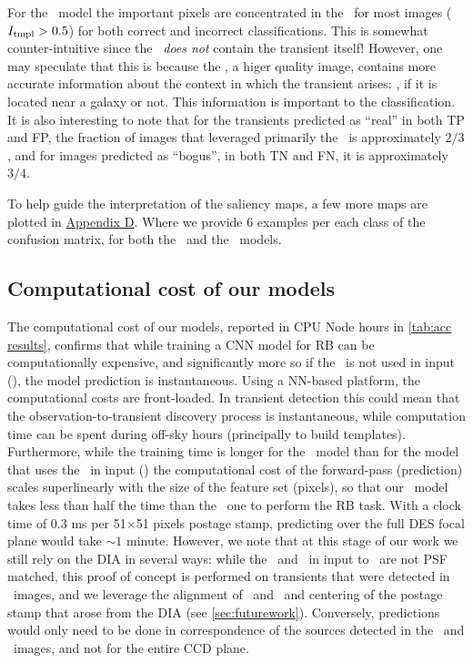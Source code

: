 For the \nodia\ model the important pixels are concentrated in the \temp\  for most images ($I_\mathrm{tmpl} > 0.5$) for both correct and incorrect classifications.
This is somewhat counter-intuitive since the \temp\ {\it does not} contain the transient itself! However, one may speculate that this is because the \temp, a higer quality image, contains more accurate information about the context in which the transient arises: \eg, if it is located near a galaxy or not. This information is important to the classification. It is also interesting to note that for the transients predicted as ``real'' in both TP and FP, the fraction of images that leveraged primarily the \temp\ is approximately $2/3$, and for images predicted as ``bogus'', in both TN and FN, it is approximately $3/4$.

To help guide the interpretation of the saliency maps, a few more maps are plotted in \hyperref[sec:appendixc]{Appendix D}. Where we provide 6 examples per each class of the confusion matrix, for both the \diabased\ and the \nodia\ models. 

\subsection{Computational cost of our models}\label{sec:computationcost}
The computational cost of our models, reported in CPU Node hours in \autoref{tab:acc results}, confirms that while training a CNN model for RB can be computationally expensive, and significantly more so if the \diff\ is not used in input (\nodia), the model prediction is instantaneous. Using a NN-based platform, the computational costs are front-loaded. In transient detection this could mean that the observation-to-transient discovery process is instantaneous, while computation time can be spent during off-sky hours (principally to build templates). Furthermore, while the training time is longer for the \nodia\ model than for the model that uses the \diff\ in input (\diabased) the computational cost of the forward-pass (prediction) scales superlinearly with the size of the feature set (pixels), so that our \nodia\ model takes less than half the time than the \diabased\ one to perform the RB task. With a clock time of 0.3 ms per 51$\times$51 pixels postage stamp, predicting over the full DES focal plane would take $\sim 1$ minute. However, we note that at this stage of our work we still rely on the DIA in several ways: while the \temp\ and \search\ in input to \nodia\ are not PSF matched, this proof of concept is performed on transients that were detected in \diff\ images, and we leverage the alignment of \temp\ and \search\ and centering of the postage stamp that arose from the DIA (see \autoref{sec:futurework}). Conversely, predictions would only need to be done in correspondence of the sources detected in the \temp\ and \search\ images, and not for the entire CCD plane.




